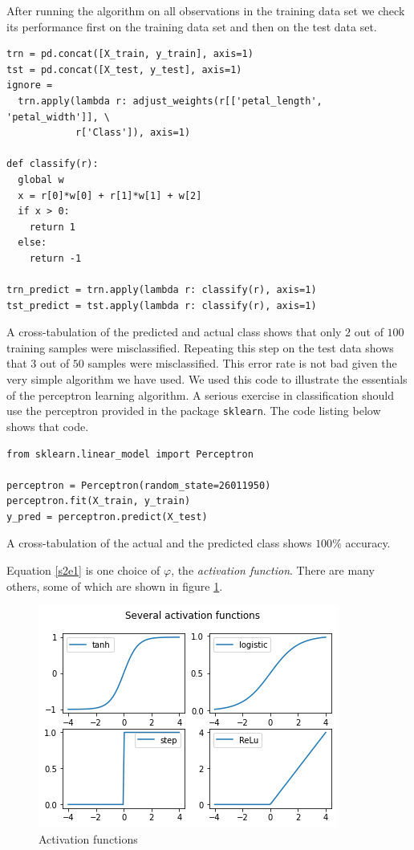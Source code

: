 \documentclass[11pt]{article}
\numberwithin{equation}{section}
\begin{document}
After running the algorithm on all observations in the training data set
we check its performance first on the training data set and then on the
test data set.
\begin{verbatim}
trn = pd.concat([X_train, y_train], axis=1)
tst = pd.concat([X_test, y_test], axis=1)
ignore = 
  trn.apply(lambda r: adjust_weights(r[['petal_length', 'petal_width']], \
            r['Class']), axis=1)

def classify(r):
  global w
  x = r[0]*w[0] + r[1]*w[1] + w[2]
  if x > 0:
    return 1
  else:
    return -1

trn_predict = trn.apply(lambda r: classify(r), axis=1)
tst_predict = tst.apply(lambda r: classify(r), axis=1)
\end{verbatim}

A cross-tabulation of the predicted and actual class shows that only $2$
out of $100$ training samples were misclassified. Repeating this step on
the test data shows that $3$ out of $50$ samples were misclassified. This 
error rate is not bad given the very simple algorithm we have used. We 
used this code to illustrate the essentials of the perceptron learning 
algorithm. A serious exercise in classification should use the perceptron
provided in the package \texttt{sklearn}. The code 
listing below shows that code.
\begin{verbatim}
from sklearn.linear_model import Perceptron

perceptron = Perceptron(random_state=26011950)
perceptron.fit(X_train, y_train)
y_pred = perceptron.predict(X_test)
\end{verbatim}
A cross-tabulation of the actual and the predicted class shows $100\%$
accuracy.

Equation \eqref{s2e1} is one choice of $\varphi$, the \emph{activation
function}. There are many others, some of which are shown in figure
\ref{f3}.
\begin{figure}[!ht]
\centering
\includegraphics[scale=0.8]{activation}
\caption{Activation functions}
\label{f3}
\end{figure}
\end{document}
